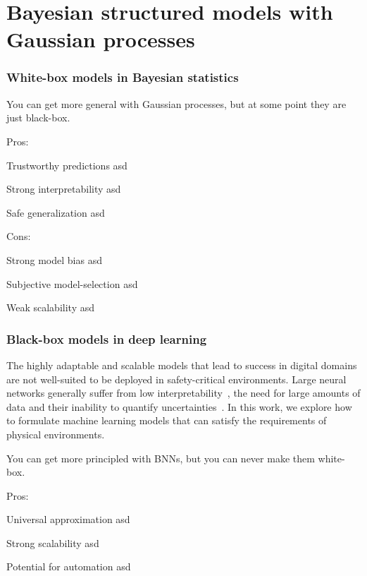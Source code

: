 \section{Bayesian structured models with Gaussian processes}

\subsubsection{White-box models in Bayesian statistics}
\blindtext

You can get more general with Gaussian processes, but at some point they are just black-box.

\begin{titledesc}{Pros:}
    \item[Trustworthy predictions] asd
    \item[Strong interpretability] asd
    \item[Safe generalization] asd
\end{titledesc}

\begin{titledesc}{Cons:}
    \item[Strong model bias] asd
    \item[Subjective model-selection] asd
    \item[Weak scalability] asd
\end{titledesc}


\subsubsection{Black-box models in deep learning}
The highly adaptable and scalable models that lead to success in digital domains are not well-suited to be deployed in safety-critical environments.
Large neural networks generally suffer from low interpretability~\parencite{rudin_stop_2019}, the need for large amounts of data and their inability to quantify uncertainties~\parencite{goodfellow_deep_2016}.
In this work, we explore how to formulate machine learning models that can satisfy the requirements of physical environments.

You can get more principled with BNNs, but you can never make them white-box.

\begin{titledesc}{Pros:}
    \item[Universal approximation] asd
    \item[Strong scalability] asd
    \item[Potential for automation] asd
\end{titledesc}


